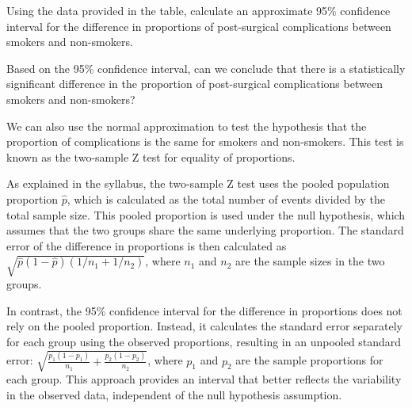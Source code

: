 \documentclass[
  letterpaper,
  DIV=11,
  numbers=noendperiod]{scrartcl}
\begin{document}
\begin{tcolorbox}[enhanced jigsaw, bottomrule=.15mm, coltitle=black, colbacktitle=quarto-callout-important-color!10!white, left=2mm, bottomtitle=1mm, breakable, colframe=quarto-callout-important-color-frame, toprule=.15mm, titlerule=0mm, title={Question 1}, opacitybacktitle=0.6, arc=.35mm, rightrule=.15mm, opacityback=0, leftrule=.75mm, toptitle=1mm, colback=white]

Using the data provided in the table, calculate an approximate 95\%
confidence interval for the difference in proportions of post-surgical
complications between smokers and non-smokers.

\end{tcolorbox}

\begin{tcolorbox}[enhanced jigsaw, bottomrule=.15mm, coltitle=black, colbacktitle=quarto-callout-important-color!10!white, left=2mm, bottomtitle=1mm, breakable, colframe=quarto-callout-important-color-frame, toprule=.15mm, titlerule=0mm, title={Question 2}, opacitybacktitle=0.6, arc=.35mm, rightrule=.15mm, opacityback=0, leftrule=.75mm, toptitle=1mm, colback=white]

Based on the 95\% confidence interval, can we conclude that there is a
statistically significant difference in the proportion of post-surgical
complications between smokers and non-smokers?

\end{tcolorbox}

We can also use the normal approximation to test the hypothesis that the
proportion of complications is the same for smokers and non-smokers.
This test is known as the two-sample Z test for equality of proportions.

As explained in the syllabus, the two-sample Z test uses the pooled
population proportion \(\hat{p}\), which is calculated as the total
number of events divided by the total sample size. This pooled
proportion is used under the null hypothesis, which assumes that the two
groups share the same underlying proportion. The standard error of the
difference in proportions is then calculated as
\(\sqrt{\hat{p}(1-\hat{p})(1/n_1 + 1/n_2)}\), where \(n_1\) and \(n_2\)
are the sample sizes in the two groups.

In contrast, the 95\% confidence interval for the difference in
proportions does not rely on the pooled proportion. Instead, it
calculates the standard error separately for each group using the
observed proportions, resulting in an unpooled standard error:
\(\sqrt{\frac{p_1(1-p_1)}{n_1} + \frac{p_2(1-p_2)}{n_2}}\), where
\(p_1\) and \(p_2\) are the sample proportions for each group. This
approach provides an interval that better reflects the variability in
the observed data, independent of the null hypothesis assumption.
\end{document}

